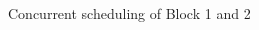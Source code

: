 \documentclass[notes xcolor=dvipsnames]{beamer}
\begin{document}
    \begin{frame}{Concurrent scheduling of Block 1 and 2}

        \begin{columns}
            
            \begin{column}{0.5\textwidth}
                \begin{figure}
                \end{figure}

                \begin{figure}
                \end{figure}

                \begin{figure}
                \end{figure}

                
            \end{column}

            \begin{column}{0.5\textwidth}
                
                \begin{figure}
                \end{figure}


\end{column}
\end{columns}
\end{frame}
\end{document}
